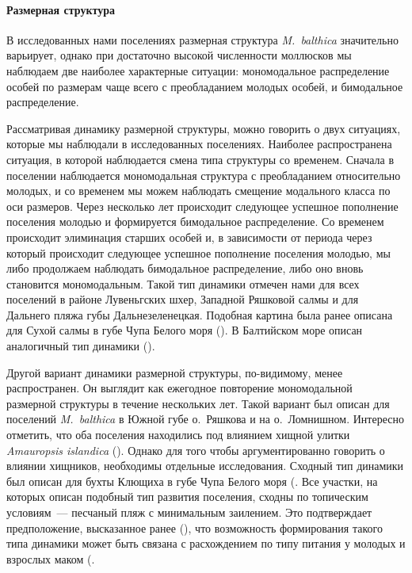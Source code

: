 {{%
\paragraph{Размерная структура}
В исследованных нами поселениях размерная структура \textit{M.~balthica} значительно варьирует, однако при достаточно высокой численности моллюсков мы наблюдаем две наиболее характерные ситуации: мономодальное распределение особей по размерам чаще всего с преобладанием молодых особей, и бимодальное распределение.

Рассматривая динамику размерной структуры, можно говорить о  двух ситуациях, которые мы наблюдали в исследованных поселениях.
Наиболее распространена ситуация, в которой наблюдается смена типа структуры со временем. 
Сначала в поселении наблюдается мономодальная структура с преобладанием относительно молодых, и со временем мы можем наблюдать смещение модального класса по оси размеров. 
Через несколько лет происходит следующее успешное пополнение поселения молодью и формируется бимодальное распределение.
Со временем происходит элиминация старших особей и, в зависимости от периода через который происходит следующее успешное пополнение поселения молодью, мы либо продолжаем наблюдать бимодальное распределение, либо оно вновь становится мономодальным.
Такой тип динамики отмечен нами для всех поселений в районе Лувеньгских шхер, Западной Ряшковой салмы  и для Дальнего пляжа губы Дальнезеленецкая.
Подобная картина была ранее описана для Сухой салмы в губе Чупа Белого моря (\cite{Maximovich_et_al_1991}).
В Балтийском море описан аналогичный тип динамики (\cite{Segerstrale_1969}).

Другой вариант динамики размерной структуры, по-видимому, менее распространен.
Он выглядит как ежегодное повторение мономодальной размерной структуры в течение нескольких лет.
Такой вариант был описан для поселений \textit{M.~balthica} в Южной губе о.~Ряшкова и на о.~Ломнишном.
Интересно отметить, что оба поселения находились под влиянием хищной улитки \textit{Amauropsis islandica} (\cite{Aristov_Granovich_2011}).
Однако для того чтобы аргументированно говорить о влиянии хищников, необходимы отдельные исследования.
Сходный тип динамики был описан для бухты Клющиха в губе Чупа Белого моря (\cite{Maximovich_et_al_1991, Gerasimova_Maximovich_2013}.
Все участки, на которых описан подобный тип развития поселения, сходны по топическим условиям~--- песчаный пляж с минимальным заилением.
Это подтверждает предположение, высказанное ранее (\cite{Gerasimova_Maximovich_2013}), что возможность формирования такого типа динамики может быть связана с расхождением по типу питания у молодых и взрослых маком (\cite{Gerasimova_1988, Olafsson_1989}.


}}
